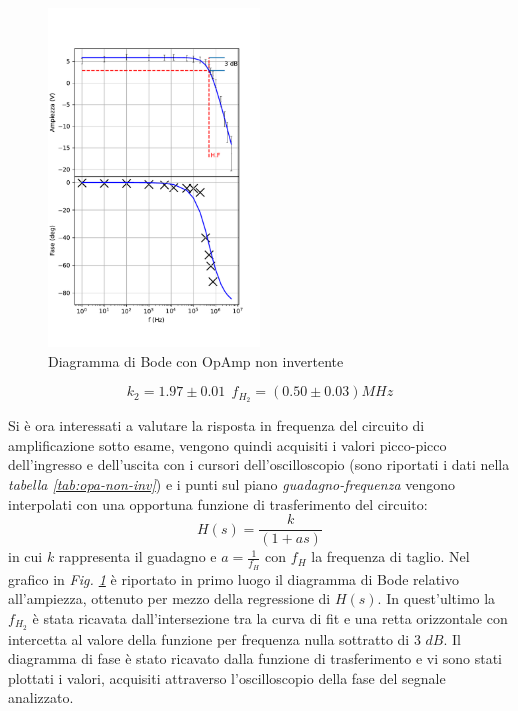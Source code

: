 \documentclass[journal]{IEEEtran}
\begin{document}
\begin{figure}[H]%
\begin {center}
\includegraphics[width=0.50\textwidth]{analysis/output/OPA-bode_gain2(mag+phase).pdf}
\caption{Diagramma di Bode con OpAmp non invertente}
\label{fig:gain2}
\end{center}
\end{figure}


\[k_2 = 1.97 \pm 0.01 \: \: f_{H_2} = (0.50 \pm 0.03) MHz\]

Si è ora interessati a valutare la risposta in frequenza del circuito di amplificazione sotto esame, vengono quindi acquisiti i valori picco-picco dell'ingresso e dell'uscita con i cursori dell'oscilloscopio (sono riportati i dati nella \textit{tabella \ref{tab:opa-non-inv}}) e i punti sul piano \textit{guadagno-frequenza} vengono interpolati con una opportuna funzione di trasferimento del circuito:
\[H(s)=\frac{k}{(1+as)}\] 
in cui $k$ rappresenta il guadagno e $a = \frac{1}{f_H}$ con $f_H$ la frequenza di taglio.
Nel grafico in \textit{Fig. \ref{fig:gain2}} è riportato in primo luogo il diagramma di Bode relativo all'ampiezza, ottenuto per mezzo della regressione di $H(s)$. In quest'ultimo la $f_H_2$ è stata ricavata dall'intersezione tra la curva di fit e una retta orizzontale con intercetta al valore della funzione per frequenza nulla sottratto di $3$ $dB$. Il diagramma di fase è stato ricavato dalla funzione di trasferimento e vi sono stati plottati i valori, acquisiti attraverso l'oscilloscopio della fase del segnale analizzato. 
\end{document}
